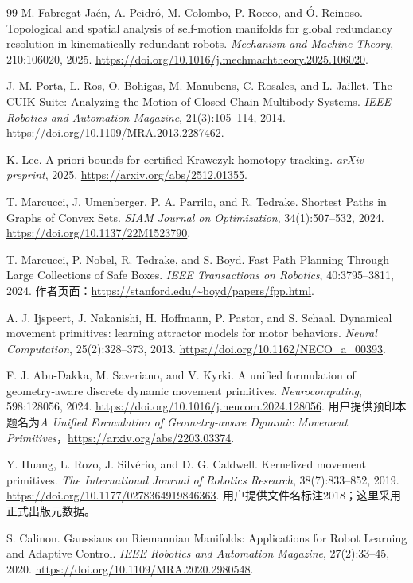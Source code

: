 \documentclass[UTF8,11pt,a4paper,fontset=fandol]{ctexart}
\numberwithin{equation}{section}
\theoremstyle{definition}
\begin{document}
\begin{thebibliography}{99}
M. Fabregat-Ja\'en, A. Peidr\'o, M. Colombo, P. Rocco, and \'{O}. Reinoso.
Topological and spatial analysis of self-motion manifolds for global redundancy resolution in kinematically redundant robots.
\emph{Mechanism and Machine Theory}, 210:106020, 2025.
\url{https://doi.org/10.1016/j.mechmachtheory.2025.106020}.

J. M. Porta, L. Ros, O. Bohigas, M. Manubens, C. Rosales, and L. Jaillet.
The CUIK Suite: Analyzing the Motion of Closed-Chain Multibody Systems.
\emph{IEEE Robotics and Automation Magazine}, 21(3):105--114, 2014.
\url{https://doi.org/10.1109/MRA.2013.2287462}.

K. Lee.
A priori bounds for certified Krawczyk homotopy tracking.
\emph{arXiv preprint}, 2025.
\url{https://arxiv.org/abs/2512.01355}.

T. Marcucci, J. Umenberger, P. A. Parrilo, and R. Tedrake.
Shortest Paths in Graphs of Convex Sets.
\emph{SIAM Journal on Optimization}, 34(1):507--532, 2024.
\url{https://doi.org/10.1137/22M1523790}.

T. Marcucci, P. Nobel, R. Tedrake, and S. Boyd.
Fast Path Planning Through Large Collections of Safe Boxes.
\emph{IEEE Transactions on Robotics}, 40:3795--3811, 2024.
作者页面：\url{https://stanford.edu/~boyd/papers/fpp.html}.

A. J. Ijspeert, J. Nakanishi, H. Hoffmann, P. Pastor, and S. Schaal.
Dynamical movement primitives: learning attractor models for motor behaviors.
\emph{Neural Computation}, 25(2):328--373, 2013.
\url{https://doi.org/10.1162/NECO_a_00393}.

F. J. Abu-Dakka, M. Saveriano, and V. Kyrki.
A unified formulation of geometry-aware discrete dynamic movement primitives.
\emph{Neurocomputing}, 598:128056, 2024.
\url{https://doi.org/10.1016/j.neucom.2024.128056}.
用户提供预印本题名为\emph{A Unified Formulation of Geometry-aware Dynamic Movement Primitives}，\url{https://arxiv.org/abs/2203.03374}.

Y. Huang, L. Rozo, J. Silv\'erio, and D. G. Caldwell.
Kernelized movement primitives.
\emph{The International Journal of Robotics Research}, 38(7):833--852, 2019.
\url{https://doi.org/10.1177/0278364919846363}.
用户提供文件名标注2018；这里采用正式出版元数据。

S. Calinon.
Gaussians on Riemannian Manifolds: Applications for Robot Learning and Adaptive Control.
\emph{IEEE Robotics and Automation Magazine}, 27(2):33--45, 2020.
\url{https://doi.org/10.1109/MRA.2020.2980548}.


\end{thebibliography}
\end{document}

